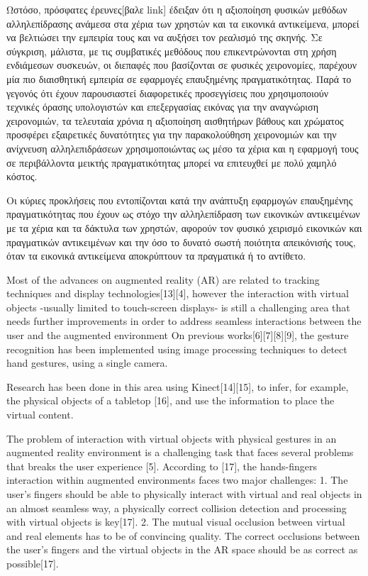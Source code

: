 Ωστόσο, πρόσφατες έρευνες[βαλε link] έδειξαν ότι η αξιοποίηση φυσικών μεθόδων αλληλεπίδρασης ανάμεσα στα χέρια των χρηστών και τα εικονικά αντικείμενα, μπορεί να βελτιώσει την εμπειρία τους και να αυξήσει τον ρεαλισμό της σκηνής.  Σε σύγκριση, μάλιστα, με τις συμβατικές μεθόδους που επικεντρώνονται στη χρήση ενδιάμεσων συσκευών, οι διεπαφές που βασίζονται σε φυσικές χειρονομίες, παρέχουν μία πιο διαισθητική εμπειρία σε εφαρμογές επαυξημένης πραγματικότητας. Παρά το γεγονός ότι έχουν παρουσιαστεί διαφορετικές προσεγγίσεις που χρησιμοποιούν τεχνικές όρασης υπολογιστών και επεξεργασίας εικόνας για την αναγνώριση χειρονομιών, τα τελευταία χρόνια η αξιοποίηση αισθητήρων βάθους και χρώματος προσφέρει εξαιρετικές δυνατότητες για την παρακολούθηση χειρονομιών και την ανίχνευση αλληλεπιδράσεων χρησιμοποιώντας ως μέσο τα χέρια και η εφαρμογή τους σε περιβάλλοντα μεικτής πραγματικότητας μπορεί να επιτευχθεί με πολύ χαμηλό κόστος.

Οι κύριες προκλήσεις που εντοπίζονται κατά την ανάπτυξη εφαρμογών επαυξημένης πραγματικότητας που έχουν ως στόχο την αλληλεπίδραση των εικονικών αντικειμένων με τα χέρια και τα δάκτυλα των χρηστών, αφορούν τον φυσικό χειρισμό εικονικών και πραγματικών αντικειμένων και την όσο το δυνατό σωστή ποιότητα απεικόνισής τους, όταν τα εικονικά αντικείμενα αποκρύπτουν τα πραγματικά ή το αντίθετο.

Most of the advances on augmented reality (AR) are related to tracking techniques and display technologies[13][4], however the interaction with virtual objects -usually limited to touch-screen displays- is still a challenging area that needs further improvements in order to address seamless interactions between the user and the augmented environment On previous works[6][7][8][9], the gesture recognition has been implemented using image processing techniques to detect hand gestures, using a single camera. 

Research has been done in this area using Kinect[14][15], to infer, for example, the physical objects of a tabletop [16], and use the information to place the virtual content. 

The problem of interaction with virtual objects with physical gestures in an augmented reality environment is a challenging task that faces several problems that breaks the user experience [5]. According to [17], the hands-fingers interaction within augmented environments faces two major challenges: 1. The user’s fingers should be able to physically interact with virtual and real objects in an almost seamless way, a physically correct collision detection and processing with virtual objects is key[17]. 2. The mutual visual occlusion between virtual and real elements has to be of convincing quality. The correct occlusions between the user’s fingers and the virtual objects in the AR space should be as correct as possible[17].





